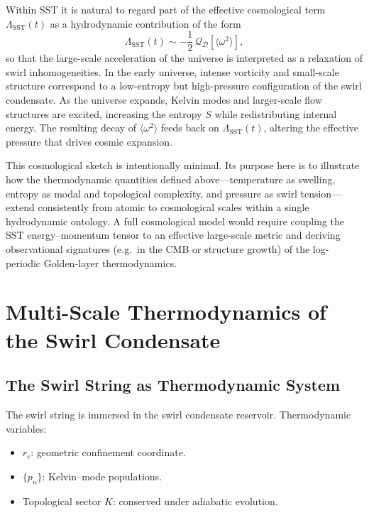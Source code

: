 \documentclass[11pt]{article}
\newcommand{\rc}{r_c}                                    %
\begin{document}
            Within SST it is natural to regard part of the effective cosmological
            term $\Lambda_{\text{SST}}(t)$ as a hydrodynamic contribution of the
            form
            \begin{equation}
                \Lambda_{\text{SST}}(t)
                \sim -\frac{1}{2}\,\mathcal{Q}_{\mathcal{D}}[\langle \omega^2 \rangle],
            \end{equation}
            so that the large-scale acceleration of the universe is interpreted as
            a relaxation of swirl inhomogeneities.
            In the early universe, intense vorticity and small-scale structure
            correspond to a low-entropy but high-pressure configuration of the
            swirl condensate.
            As the universe expands, Kelvin modes and larger-scale flow
            structures are excited, increasing the entropy $S$ while redistributing
            internal energy.
            The resulting decay of $\langle \omega^2 \rangle$ feeds back on
            $\Lambda_{\text{SST}}(t)$, altering the effective pressure that drives
            cosmic expansion.

            This cosmological sketch is intentionally minimal.
            Its purpose here is to illustrate how the thermodynamic quantities
            defined above---temperature as swelling, entropy as modal and
            topological complexity, and pressure as swirl tension---extend
            consistently from atomic to cosmological scales within a single
            hydrodynamic ontology.
            A full cosmological model would require coupling the SST
            energy--momentum tensor to an effective large-scale metric and
            deriving observational signatures (e.g.\ in the CMB or structure
            growth) of the log-periodic Golden-layer thermodynamics.

    \section{Multi-Scale Thermodynamics of the Swirl Condensate}

        \subsection{The Swirl String as Thermodynamic System}

            The swirl string is immersed in the swirl condensate reservoir.
            Thermodynamic variables:
            \begin{itemize}
                \item $\rc$: geometric confinement coordinate.
                \item $\{p_n\}$: Kelvin--mode populations.
                \item Topological sector $K$: conserved under adiabatic evolution.
            \end{itemize}
\end{document}
